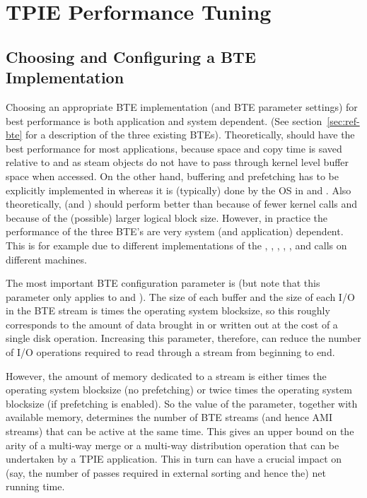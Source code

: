 \section{TPIE Performance Tuning}

\subsection{Choosing and Configuring a BTE Implementation}


Choosing an appropriate BTE implementation (and BTE
parameter settings) for best performance is both application
and system dependent. (See section~\ref{sec:ref-bte} for a
description of the three existing BTEs). Theoretically,
 should have the best performance for most
applications, because space and copy time is saved relative
to  and  as steam
objects do not have to pass through kernel level buffer
space when accessed. On the other hand, buffering and
prefetching has to be explicitly implemented in
 whereas it is (typically) done by the OS
in  and .  Also
theoretically,  (and )
should perform better than  because of
fewer kernel calls and because of the (possible) larger
logical block size.  However, in practice the performance of
the three BTE's are very system (and application) dependent.
This is for example due to different implementations of the
, , ,
, , and 
calls on different machines.

The most important BTE configuration parameter is
 (but note that this
parameter only applies to  and
).  The size of each buffer and the size of
each I/O in the BTE stream is
 times the operating
system blocksize, so this roughly corresponds to the amount
of data brought in or written out at the cost of a single
disk operation. Increasing this parameter, therefore, can
reduce the number of I/O operations required to read through
a stream from beginning to end.

However, the amount of memory dedicated to a stream is
either  times the
operating system blocksize (no prefetching) or twice
 times the operating
system blocksize (if prefetching is enabled). So the value
of the  parameter,
together with available memory, determines the number of BTE
streams (and hence AMI streams) that can be active at the
same time. This gives an upper bound on the arity of a
multi-way merge or a multi-way distribution operation that
can be undertaken by a TPIE application. This in turn can
have a crucial impact on (say, the number of passes required
in external sorting and hence the) net running time.

